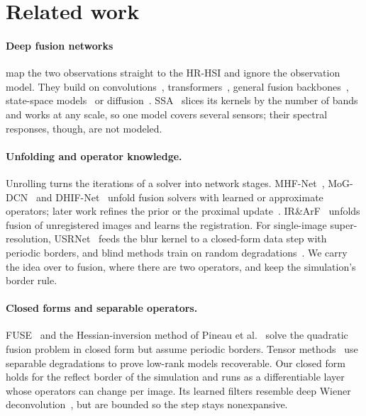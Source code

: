 \documentclass[10pt,twocolumn,letterpaper]{article}
\begin{document}
\section{Related work}
\label{sec:related}
\paragraph{Deep fusion networks} map the two observations straight to the HR-HSI and ignore the observation model. They build on convolutions~\cite{zhang2021ssrnet}, transformers~\cite{li2024mimformer,deng2023psrt,ma2024reciprocal,fang2024mimosst,yang2026clsnet}, general fusion backbones~\cite{peng2023u2net}, state-space models~\cite{pei2026s3o} or diffusion~\cite{chen2026twostage}. SSA~\cite{liang2026ssa} slices its kernels by the number of bands and works at any scale, so one model covers several sensors; their spectral responses, though, are not modeled.

\paragraph{Unfolding and operator knowledge.} Unrolling turns the iterations of a solver into network stages. MHF-Net~\cite{xie2022mhfnet}, MoG-DCN~\cite{dong2021mogdcn} and DHIF-Net~\cite{huang2022dhif} unfold fusion solvers with learned or approximate operators; later work refines the prior or the proximal update~\cite{yu2025otpnet}. IR\&ArF~\cite{qu2025irarf} unfolds fusion of unregistered images and learns the registration. For single-image super-resolution, USRNet~\cite{zhang2020usrnet} feeds the blur kernel to a closed-form data step with periodic borders, and blind methods train on random degradations~\cite{zhang2021bsrgan}. We carry the idea over to fusion, where there are two operators, and keep the simulation's border rule.

\paragraph{Closed forms and separable operators.} FUSE~\cite{wei2015fuse} and the Hessian-inversion method of Pineau et al.~\cite{pineau2023exact} solve the quadratic fusion problem in closed form but assume periodic borders. Tensor methods~\cite{li2018cstf} use separable degradations to prove low-rank models recoverable. Our closed form holds for the reflect border of the simulation and runs as a differentiable layer whose operators can change per image. Its learned filters resemble deep Wiener deconvolution~\cite{dong2020wiener}, but are bounded so the step stays nonexpansive.
\end{document}

